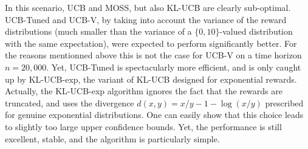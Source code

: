 \documentclass[wcp]{jmlr}
\newcommand{\1}{\mathbbm{1}}
\begin{document}
{In this scenario, UCB and MOSS, but also KL-UCB are clearly sub-optimal.
UCB-Tuned and UCB-V, by taking into account the variance of the reward distributions (much smaller than the variance of a $\{0,10\}$-valued distribution with the same expectation), were expected to perform significantly better. For the reasons mentionned above this is not the case for UCB-V on a time horizon $n=20,000$. Yet, UCB-Tuned is spectacularly more efficient, and is only caught up by KL-UCB-exp, the variant of KL-UCB designed for exponential rewards. 
%
Actually, the KL-UCB-exp algorithm ignores the fact that the rewards are truncated, and uses the divergence $d(x,y)=x/y-1-\log(x/y)$ prescribed for genuine exponential distributions. One can easily show that this choice leads to slightly too large upper confidence bounds. Yet, the performance is still excellent, stable, and the algorithm is particularly simple. %

}
\end{document}
